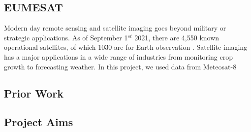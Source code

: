 
\subsection{EUMESAT}

Modern day remote sensing and satellite imaging goes beyond military or strategic applications. As of September 1$^{st}$ 2021, there are 4,550 known operational satellites, of which 1030 are for Earth observation \cite{Sat_Data}. Satellite imaging has a major applications in a wide range of industries from monitoring crop growth to forecasting weather. In this project, we used data from Meteosat-8 








\subsection{Prior Work}

\subsection{Project Aims}